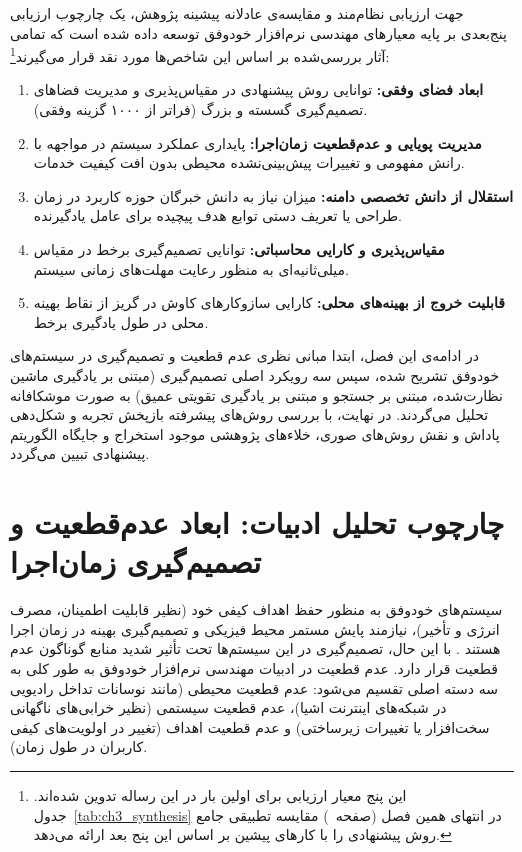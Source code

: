 \documentclass[oneside,openany,phd]{TMU-Thesis}
\begin{document}
جهت ارزیابی نظام‌مند و مقایسه‌ی عادلانه پیشینه پژوهش، یک چارچوب ارزیابی پنج‌بعدی بر پایه معیارهای مهندسی نرم‌افزار خودوفق \cite{cheng2009software, weyns2012formal} توسعه داده شده است که تمامی آثار بررسی‌شده بر اساس این شاخص‌ها مورد نقد قرار می‌گیرند\footnote{این پنج معیار ارزیابی برای اولین بار در این رساله تدوین شده‌اند. جدول~\ref{tab:ch3_synthesis} در انتهای همین فصل (صفحه~\pageref{tab:ch3_synthesis}) مقایسه تطبیقی جامع روش پیشنهادی  را با کارهای پیشین بر اساس این پنج بعد ارائه می‌دهد.}:
\begin{enumerate}
    \item \textbf{ابعاد فضای وفقی:} توانایی روش پیشنهادی در مقیاس‌پذیری و مدیریت فضاهای تصمیم‌گیری گسسته و بزرگ (فراتر از ۱۰۰۰ گزینه وفقی).
    \item \textbf{مدیریت پویایی و عدم‌قطعیت زمان‌اجرا:} پایداری عملکرد سیستم در مواجهه با رانش مفهومی و تغییرات پیش‌بینی‌نشده محیطی بدون افت کیفیت خدمات.
    \item \textbf{استقلال از دانش تخصصی دامنه:} میزان نیاز به دانش خبرگان حوزه کاربرد در زمان طراحی یا تعریف دستی توابع هدف پیچیده برای عامل یادگیرنده.
    \item \textbf{مقیاس‌پذیری و کارایی محاسباتی:} توانایی تصمیم‌گیری برخط در مقیاس میلی‌ثانیه‌ای به منظور رعایت مهلت‌های زمانی سیستم.
    \item \textbf{قابلیت خروج از بهینه‌های محلی:} کارایی سازوکارهای کاوش در گریز از نقاط بهینه محلی در طول یادگیری برخط.
\end{enumerate}

در ادامه‌ی این فصل، ابتدا مبانی نظری عدم قطعیت و تصمیم‌گیری در سیستم‌های خودوفق تشریح شده، سپس سه رویکرد اصلی تصمیم‌گیری (مبتنی بر یادگیری ماشین نظارت‌شده، مبتنی بر جستجو و مبتنی بر یادگیری تقویتی عمیق) به صورت موشکافانه تحلیل می‌گردند. در نهایت، با بررسی روش‌های پیشرفته بازپخش تجربه و شکل‌دهی پاداش و نقش روش‌های صوری، خلاءهای پژوهشی موجود استخراج و جایگاه الگوریتم پیشنهادی  تبیین می‌گردد.

\section{چارچوب تحلیل ادبیات: ابعاد عدم‌قطعیت و تصمیم‌گیری زمان‌اجرا}
\label{sec:ch3_foundations}

سیستم‌های خودوفق به منظور حفظ اهداف کیفی خود (نظیر قابلیت اطمینان، مصرف انرژی و تأخیر)، نیازمند پایش مستمر محیط فیزیکی و تصمیم‌گیری بهینه در زمان اجرا هستند \cite{kephart2003vision, cheng2009software}. با این حال، تصمیم‌گیری در این سیستم‌ها تحت تأثیر شدید منابع گوناگون عدم قطعیت قرار دارد. عدم قطعیت در ادبیات مهندسی نرم‌افزار خودوفق \cite{cheng2009software, esfahani2013uncertainty} به طور کلی به سه دسته اصلی تقسیم می‌شود: عدم قطعیت محیطی (مانند نوسانات تداخل رادیویی در شبکه‌های اینترنت اشیا)، عدم قطعیت سیستمی (نظیر خرابی‌های ناگهانی سخت‌افزار یا تغییرات زیرساختی) و عدم قطعیت اهداف (تغییر در اولویت‌های کیفی کاربران در طول زمان).
\end{document}
